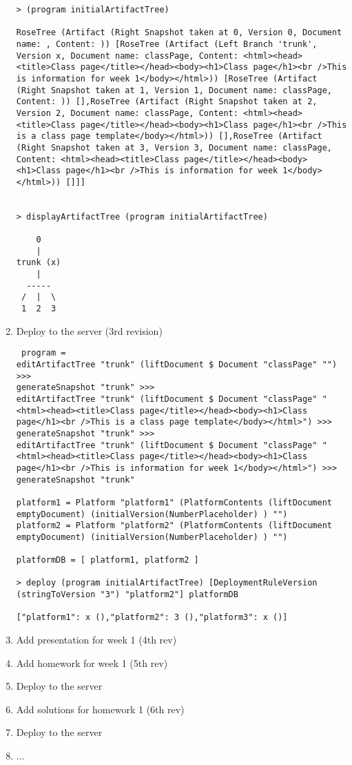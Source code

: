 \documentclass[11pt]{article}
\begin{document}
\begin{enumerate}
\begin{lstlisting}
> (program initialArtifactTree)

RoseTree (Artifact (Right Snapshot taken at 0, Version 0, Document name: , Content: )) [RoseTree (Artifact (Left Branch 'trunk', Version x, Document name: classPage, Content: <html><head><title>Class page</title></head><body><h1>Class page</h1><br />This is information for week 1</body></html>)) [RoseTree (Artifact (Right Snapshot taken at 1, Version 1, Document name: classPage, Content: )) [],RoseTree (Artifact (Right Snapshot taken at 2, Version 2, Document name: classPage, Content: <html><head><title>Class page</title></head><body><h1>Class page</h1><br />This is a class page template</body></html>)) [],RoseTree (Artifact (Right Snapshot taken at 3, Version 3, Document name: classPage, Content: <html><head><title>Class page</title></head><body><h1>Class page</h1><br />This is information for week 1</body></html>)) []]]


> displayArtifactTree (program initialArtifactTree)

    0    
    |    
trunk (x)
    |    
  -----  
 /  |  \ 
 1  2  3   

\end{lstlisting}
\item Deploy to the server (3rd revision)
 \begin{lstlisting}
 program = 
editArtifactTree "trunk" (liftDocument $ Document "classPage" "") >>> 
generateSnapshot "trunk" >>> 
editArtifactTree "trunk" (liftDocument $ Document "classPage" "<html><head><title>Class page</title></head><body><h1>Class page</h1><br />This is a class page template</body></html>") >>> 
generateSnapshot "trunk" >>> 
editArtifactTree "trunk" (liftDocument $ Document "classPage" "<html><head><title>Class page</title></head><body><h1>Class page</h1><br />This is information for week 1</body></html>") >>> 
generateSnapshot "trunk" 

platform1 = Platform "platform1" (PlatformContents (liftDocument emptyDocument) (initialVersion(NumberPlaceholder) ) "")
platform2 = Platform "platform2" (PlatformContents (liftDocument emptyDocument) (initialVersion(NumberPlaceholder) ) "")

platformDB = [ platform1, platform2 ]

> deploy (program initialArtifactTree) [DeploymentRuleVersion (stringToVersion "3") "platform2"] platformDB

["platform1": x (),"platform2": 3 (),"platform3": x ()]
 \end{lstlisting}
\item Add presentation for week 1 (4th rev)
\item Add homework for week 1 (5th rev)
\item Deploy to the server
\item Add solutions for homework 1 (6th rev)
\item Deploy to the server
\item ...
\end{enumerate}
\end{document}
